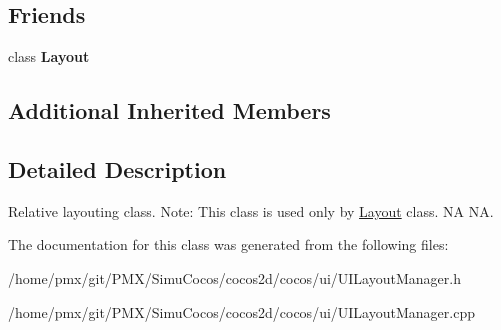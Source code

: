 \subsection*{Friends}
\begin{DoxyCompactItemize}
\item 
\mbox{\label{classui_1_1RelativeLayoutManager_a1b7da28ed84c0763e8f92cde2df4799b}} 
class {\bfseries Layout}
\end{DoxyCompactItemize}
\subsection*{Additional Inherited Members}


\subsection{Detailed Description}
Relative layouting class. Note\+: This class is used only by {\ttfamily \hyperlink{classui_1_1Layout}{Layout}} class.  NA  NA. 

The documentation for this class was generated from the following files\+:\begin{DoxyCompactItemize}
\item 
/home/pmx/git/\+P\+M\+X/\+Simu\+Cocos/cocos2d/cocos/ui/U\+I\+Layout\+Manager.\+h\item 
/home/pmx/git/\+P\+M\+X/\+Simu\+Cocos/cocos2d/cocos/ui/U\+I\+Layout\+Manager.\+cpp\end{DoxyCompactItemize}
